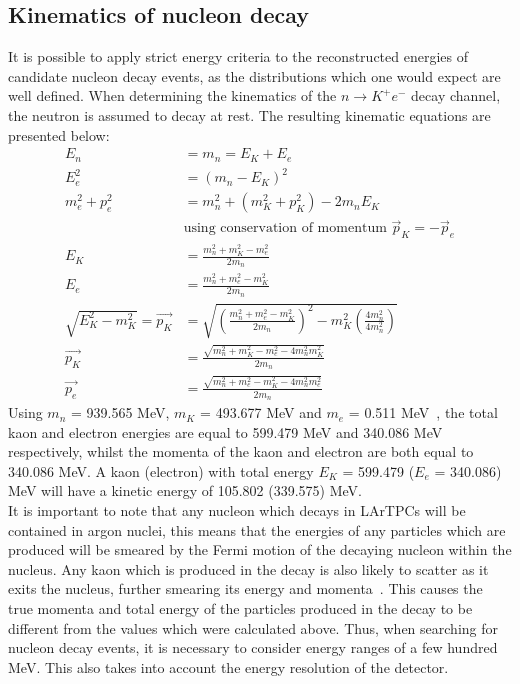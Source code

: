 \subsection{Kinematics of nucleon decay} \label{sec:NDKKin}
It is possible to apply strict energy criteria to the reconstructed energies of candidate nucleon decay events, as the distributions which one would expect are well defined. When determining the kinematics of the $n \rightarrow K^{+} e^{-}$ decay channel, the neutron is assumed to decay at rest. The resulting kinematic equations are presented below:
\begin{align}
  E_{n} &= m_{n} = E_{K} + E_{e} \nonumber \\
  E_{e}^{2} &= (m_{n} - E_{K})^{2} \nonumber \\
  m_{e}^{2} + p_{e}^{2} &= m_{n}^{2} + (m_{K}^{2} + p_{K}^{2}) - 2m_{n}E_{K} \nonumber \\
  &\text{using conservation of momentum $\vec{p}_{K} = -\vec{p}_{e}$} \nonumber \\  
  E_{K} &= \frac{m_n^{2} + m_{K}^{2} - m_{e}^{2}}{2m_{n}} \label{eq:DecKEn} \\
  E_{e} &= \frac{m_n^{2} + m_{e}^{2} - m_{K}^{2}}{2m_{n}} \label{eq:DecEEn} \\
  \sqrt{E_{K}^{2} - m_{K}^{2}} = \vec{p_{K}} &= \sqrt{ \left(\frac{m_n^{2} + m_{e}^{2} - m_{K}^{2}}{2m_{n}}\right)^{2} - m_{K}^{2}\left(\frac{4m_{n}^2}{4m_n^{2}}\right) } \nonumber \\
  \vec{p_{K}} &= \frac{ \sqrt{m_n^{2} + m_{K}^{2} - m_{e}^{2} - 4m_{n}^{2}m_{K}^{2} } }{ 2m_{n} } \label{eq:DecEMom} \\
  \vec{p_{e}} &= \frac{ \sqrt{m_n^{2} + m_{e}^{2} - m_{K}^{2} - 4m_{n}^{2}m_{e}^{2} } }{ 2m_{n} } \label{eq:DecKMom}
\end{align}
Using $m_{n}$ = 939.565 MeV, $m_{K}$ = 493.677 MeV and $m_{e}$ = 0.511 MeV~\citep{PDGReview}, the total kaon and electron energies are equal to 599.479 MeV and 340.086 MeV respectively, whilst the momenta of the kaon and electron are both equal to 340.086 MeV. A kaon (electron) with total energy $E_{K}$ = 599.479 ($E_{e}$ = 340.086) MeV will have a kinetic energy of 105.802 (339.575) MeV. \\

It is important to note that any nucleon which decays in LArTPCs will be contained in argon nuclei, this means that the energies of any particles which are produced will be smeared by the Fermi motion of the decaying nucleon within the nucleus. Any kaon which is produced in the decay is also likely to scatter as it exits the nucleus, further smearing its energy and momenta~\citep{Stefan:2008zi}. This causes the true momenta and total energy of the particles produced in the decay to be different from the values which were calculated above. Thus, when searching for nucleon decay events, it is necessary to consider energy ranges of a few hundred MeV. This also takes into account the energy resolution of the detector. \\

